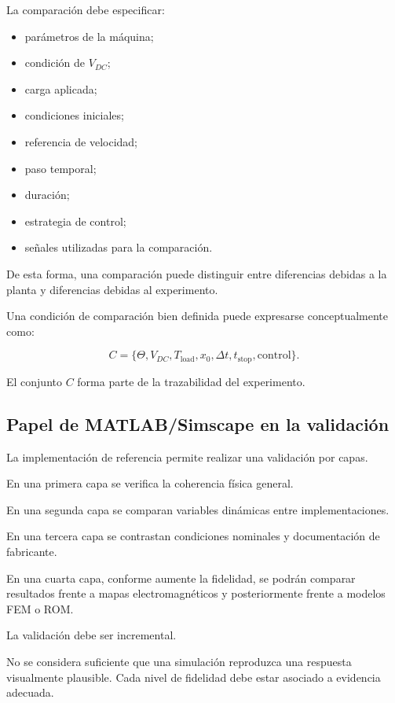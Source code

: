 La comparación debe especificar:

\begin{itemize}
    \item parámetros de la máquina;
    \item condición de $V_{DC}$;
    \item carga aplicada;
    \item condiciones iniciales;
    \item referencia de velocidad;
    \item paso temporal;
    \item duración;
    \item estrategia de control;
    \item señales utilizadas para la comparación.
\end{itemize}

De esta forma, una comparación puede distinguir entre diferencias debidas a la planta y diferencias debidas al experimento.

Una condición de comparación bien definida puede expresarse conceptualmente como:

\begin{equation}
C=
\{
\Theta,
V_{DC},
T_{\mathrm{load}},
x_0,
\Delta t,
t_{\mathrm{stop}},
\text{control}
\}.
\end{equation}

El conjunto $C$ forma parte de la trazabilidad del experimento.

\subsection{Papel de MATLAB/Simscape en la validación}

La implementación de referencia permite realizar una validación por capas.

En una primera capa se verifica la coherencia física general.

En una segunda capa se comparan variables dinámicas entre implementaciones.

En una tercera capa se contrastan condiciones nominales y documentación de fabricante.

En una cuarta capa, conforme aumente la fidelidad, se podrán comparar resultados frente a mapas electromagnéticos y posteriormente frente a modelos FEM o ROM.

La validación debe ser incremental.

No se considera suficiente que una simulación reproduzca una respuesta visualmente plausible. Cada nivel de fidelidad debe estar asociado a evidencia adecuada.


